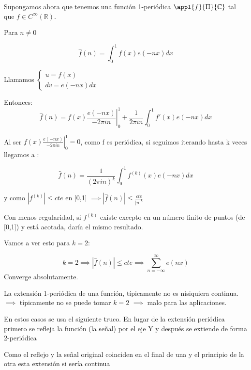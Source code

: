 \begin{example}
	Supongamos ahora que tenemos una función 1-periódica $\appl{f}{\Pi}{\mathbb{C}}$ tal que $f \in C^{\infty}(\mathbb{R})$.

	Para $n \neq 0$

	$$\widehat{f}(n) = \int_{0}^{1} f(x) e(-nx) dx$$

	Llamamos $\begin{cases}
	u = f(x)\\
	dv = e(-nx) dx
	\end{cases}$

	Entonces:
	$$\widehat{f}(n) = f(x) \left.\frac{e(-nx)}{-2\pi in}\right|_{0}^1 + \frac{1}{2\pi i n} \int_{0}^1 f'(x) e(-nx) dx$$

	Al ser $f(x) \left.\frac{e(-nx)}{-2\pi in}\right|_{0}^1 =0$, como f es periódica, si seguimos iterando hasta k veces llegamos a :

	$$\widehat{f}(n) = \frac{1}{(2\pi i n)^k} \int_{0}^1 f^{(k)}(x) e(-nx) dx$$

	y como $|f^{(k)}| \leq cte$ en [0,1] $\implies |\widehat{f}(n)| \leq \frac{cte}{|n|^k}$
\end{example}

	Con menos regularidad, si $f^{(k)}$ existe excepto en un número finito de puntos (de [0,1]) y está acotada, daría el mismo resultado.

	Vamos a ver esto para $k=2$:

\begin{example}
	$$k=2 \implies |\widehat{f}(n)| \leq cte \implies \sum_{n= -\infty}^{\infty} e(nx)$$
	Converge absolutamente.


\begin{center}
	\centering
\end{center}

	La extensión 1-periódica de una función, típicamente no es nisiquiera continua. $\implies$ típicamente no se puede tomar $k=2$ $\implies$ malo para las aplicaciones.

\end{example}

	En estos casos se usa el siguiente truco. En lugar de la extensión periódica primero se refleja la función (la señal) por el eje Y y después se extiende de forma 2-periódica

	Como el reflejo y la señal original coinciden en el final de una y el principio de la otra esta extensión si sería continua


	\begin{center}
		\centering
	\end{center}



